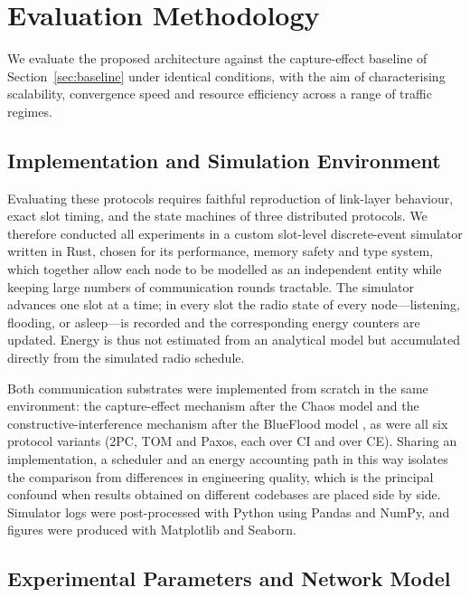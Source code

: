 \documentclass[journal]{IEEEtran}
\newcommand{\CI}{CI}                      %
\newcommand{\CE}{CE}                      %
\begin{document}
\section{Evaluation Methodology}
\label{sec:method}
We evaluate the proposed architecture against the capture-effect baseline
of Section~\ref{sec:baseline} under identical conditions, with the aim of
characterising scalability, convergence speed and resource efficiency
across a range of traffic regimes.

\subsection{Implementation and Simulation Environment}
\label{sec:method-env}

Evaluating these protocols requires faithful reproduction of link-layer
behaviour, exact slot timing, and the state machines of three distributed
protocols. We therefore conducted all experiments in a custom slot-level
discrete-event simulator written in Rust, chosen for its performance,
memory safety and type system, which together allow each node to be
modelled as an independent entity while keeping large numbers of
communication rounds tractable. The simulator advances one slot at a
time; in every slot the radio state of every node---listening, flooding,
or asleep---is recorded and the corresponding energy counters are updated.
Energy is thus not estimated from an analytical model but accumulated
directly from the simulated radio schedule.

Both communication substrates were implemented from scratch in the same
environment: the capture-effect mechanism after the Chaos model
\cite{landsiedel13chaos} and the constructive-interference mechanism after
the BlueFlood model \cite{alnahas19blueflood}, as were all six protocol
variants (2PC, TOM and Paxos, each over \CI{} and over \CE). Sharing an
implementation, a scheduler and an energy accounting path in this way
isolates the comparison from differences in engineering quality, which is
the principal confound when results obtained on different codebases are
placed side by side. Simulator logs were post-processed with Python using
Pandas and NumPy, and figures were produced with Matplotlib and Seaborn.

\subsection{Experimental Parameters and Network Model}
\label{sec:method-params}
\end{document}

